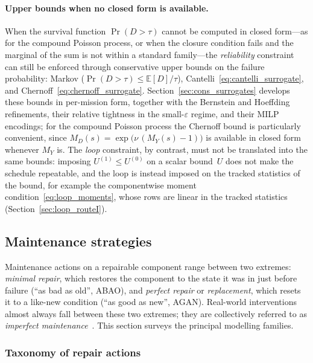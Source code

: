 \documentclass[11pt,a4paper]{article}
\theoremstyle{plain}
\theoremstyle{definition}
\theoremstyle{remark}
\begin{document}
\paragraph{Upper bounds when no closed form is available.}
When the survival function $\Pr(D > \tau)$ cannot be computed in closed form---as for the compound Poisson process, or when the closure condition fails and the marginal of the sum is not within a standard family---the \emph{reliability} constraint can still be enforced through conservative upper bounds on the failure probability: Markov ($\Pr(D > \tau) \le \mathbb{E}[D]/\tau$), Cantelli~\eqref{eq:cantelli_surrogate}, and Chernoff~\eqref{eq:chernoff_surrogate}.
Section~\ref{sec:cons_surrogates} develops these bounds in per-mission form, together with the Bernstein and Hoeffding refinements, their relative tightness in the small-$\varepsilon$ regime, and their MILP encodings; for the compound Poisson process the Chernoff bound is particularly convenient, since $M_D(s) = \exp\bigl(\nu\,(M_Y(s)-1)\bigr)$ is available in closed form whenever $M_Y$ is.
The \emph{loop} constraint, by contrast, must not be translated into the same bounds: imposing $U^{(1)} \le U^{(0)}$ on a scalar bound~$U$ does not make the schedule repeatable, and the loop is instead imposed on the tracked statistics of the bound, for example the componentwise moment condition~\eqref{eq:loop_moments}, whose rows are linear in the tracked statistics (Section~\ref{sec:loop_routeI}).

\subsection{Maintenance strategies}
\label{sec:maint_strategies}

Maintenance actions on a repairable component range between two extremes: \emph{minimal repair}, which restores the component to the state it was in just before failure (``as bad as old'', ABAO), and \emph{perfect repair} or \emph{replacement}, which resets it to a like-new condition (``as good as new'', AGAN).
Real-world interventions almost always fall between these two extremes; they are collectively referred to as \emph{imperfect maintenance}~\cite{PhamWang1996}.
This section surveys the principal modelling families.

\subsubsection{Taxonomy of repair actions}
\end{document}
